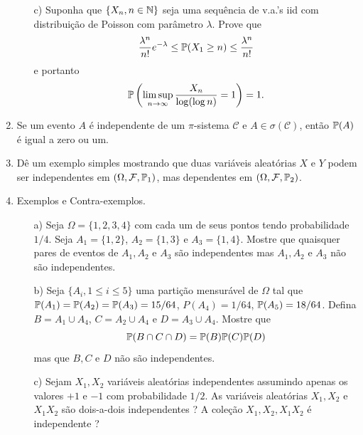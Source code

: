 \begin{enumerate}[leftmargin=*]
\begin{itemize}
		\item[c)]
		Suponha que $\{X_n, n\in\N\}$ seja uma sequência de v.a.'s 
		iid com distribuição de Poisson com parâmetro $\lambda$. 
		Prove que
			\[
				\frac{\lambda^n}{n!}e^{-\lambda}
				\leq
				\P(X_1\geq n)
				\leq
				\frac{\lambda^n}{n!}
			\]			
		e portanto 
			\[
				\P\left( 
				\limsup_{n\to\infty} \frac{X_n}{\log(\log n)}=1 
				\right)
				=1.
			\]
	\end{itemize}











\item 
Se um evento $A$ é independente de um $\pi$-sistema
$\mathcal{C}$ e $A\in \sigma(\mathcal{C})$, então 
$\P(A)$ é igual a zero ou um.









\item Dê um exemplo simples mostrando que duas 
variáveis aleatórias $X$ e $Y$ podem ser independentes
em $(\Omega,\F,\P_1)$, mas dependentes em $(\Omega,\F,\P_2)$.













\item Exemplos e Contra-exemplos.
	\begin{itemize}
		\item[a)]
		Seja $\Omega=\{1,2,3,4\}$ com cada um de seus pontos 
		tendo probabilidade $1/4$. Seja $A_1=\{1,2\}$, 
		$A_2=\{1,3\}$ e $A_3=\{1,4\}$. Mostre que quaisquer
		pares de eventos de $A_1,A_2$ e $A_3$ são independentes
		mas $A_1,A_2$ e $A_3$ não são independentes.
		
		\item[b)] 
		Seja $\{A_i, 1\leq i\leq 5\}$ uma partição mensurável de 
		$\Omega$ tal que $\P(A_1)=\P(A_2)=\P(A_3)=15/64$, 
		$P(A_4)=1/64$, $\P(A_5)=18/64$. Defina 
		$B=A_1\cup A_4$, $C=A_2\cup A_4$ e $D=A_3\cup A_4$. 
		Mostre que 
			\[
				\P(B\cap C\cap D) = \P(B)\P(C)\P(D)
			\] 
		mas que $B,C$ e $D$ não são independentes.
		
		\item[c)]
		Sejam $X_1,X_2$ variáveis aleatórias independentes
		assumindo apenas os valores $+1$ e $-1$ com probabilidade
		$1/2$. As variáveis aleatórias $X_1,X_2$ e $X_1X_2$ são 
		dois-a-dois independentes ? 
		A coleção $X_1,X_2, X_1X_2$ é independente ?
	\end{itemize}








\end{enumerate}
